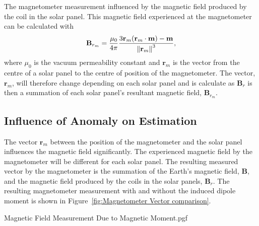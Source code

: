 The magnetometer measurement influenced by the magnetic field produced by the coil in the solar panel. This magnetic field experienced at the magnetometer can be calculated with 
\begin{equation}
\mathbf{B}_{r_m} = \frac{\mu_0}{4\pi} \frac{3 \mathbf{r}_m (\mathbf{r}_m \cdot \mathbf{m}) - \mathbf{m}}{\left\lVert\mathbf{r}_m\right\rVert^3},
\end{equation}
where $\mu_0$ is the vacuum permeability constant and $\mathbf{r}_m$ is the vector from the centre of a solar panel to the centre of position of the magnetometer. The vector, $\mathbf{r}_m$, will therefore change depending on each solar panel and is calculate as $\mathbf{B}_r$ is then a summation of each solar panel's resultant magnetic field, $\mathbf{B}_{r_m}$. 

\subsection{Influence of Anomaly on Estimation}
The vector $\mathbf{r}_m$ between the position of the magnetometer and the solar panel influences the magnetic field significantly. The experienced magnetic field by the magnetometer will be different for each solar panel. The resulting measured vector by the magnetometer is the summation of the Earth's magnetic field, $\mathbf{B}$, and the magnetic field produced by the coils in the solar panels, $\mathbf{B}_r$. The resulting magnetometer measurement with and without the induced dipole moment is shown in Figure~\ref{fig:Magnetometer Vector comparison}. 

\begin{figure*}[!htb]
		\centering
		
		{Magnetic Field Measurement Due to Magnetic Moment.pgf}
		
%	
	\caption{Difference in magnetometer unit vector in SBC due to the magnetic moment disturbance.}
	\label{fig:Magnetometer Vector comparison}
\end{figure*}

